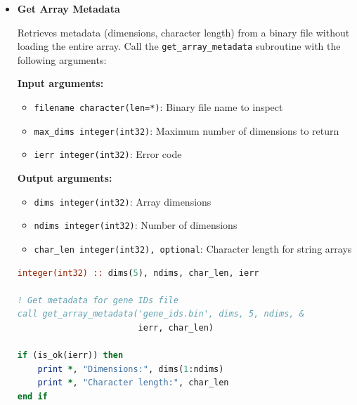 \begin{enumerate}
\begin{itemize}
\begin{lstlisting}[language=Fortran, caption={Load Shift Vectors}]
call load_shift_vectors(loaded_shifts, 'shift_vectors.bin', ierr)
                  \end{lstlisting}
                  
            \item \textbf{Get Array Metadata}
                  
                  Retrieves metadata (dimensions, character length) from a binary file
                  without loading the entire array. Call the \texttt{get\_array\_metadata}
                  subroutine with the following arguments:
                  
                  \textbf{Input arguments:}
                  \begin{itemize}
                    \item \texttt{filename character(len=*)}: Binary file name to inspect
                          
                    \item \texttt{max\_dims integer(int32)}: Maximum number of dimensions
                          to return
                          
                    \item \texttt{ierr integer(int32)}: Error code
                  \end{itemize}
                  \textbf{Output arguments:}
                  \begin{itemize}
                    \item \texttt{dims integer(int32)}: Array dimensions
                          
                    \item \texttt{ndims integer(int32)}: Number of dimensions
                          
                    \item \texttt{char\_len integer(int32), optional}: Character length for
                          string arrays
                  \end{itemize}
                  \begin{lstlisting}[language=Fortran, caption={Inspect Array File Metadata}]
integer(int32) :: dims(5), ndims, char_len, ierr

! Get metadata for gene IDs file
call get_array_metadata('gene_ids.bin', dims, 5, ndims, &
                        ierr, char_len)

if (is_ok(ierr)) then
    print *, "Dimensions:", dims(1:ndims)
    print *, "Character length:", char_len
end if


\end{lstlisting}
\end{itemize}
\end{enumerate}
